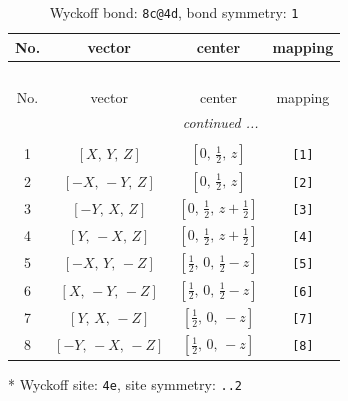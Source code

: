 \documentclass[fleqn,8pt]{jsarticle}
\begin{document}
\renewcommand{\arraystretch}{1.2}
\begin{longtable}{cccc}
\caption{Wyckoff bond: {\tt 8c@4d}, bond symmetry: {\tt 1}}
 \\
 \hline \hline
No. & vector & center & mapping \\ \hline \endfirsthead

\multicolumn{3}{l}{\tablename\ \thetable{}} \\
 \hline \hline
No. & vector & center & mapping \\ \hline \endhead

 \hline \hline
\multicolumn{3}{r}{\footnotesize\it continued ...} \\ \endfoot

 \hline \hline
\multicolumn{3}{r}{} \\ \endlastfoot

1 & $\left[ X,\, Y,\, Z \right]$ & $\left[ 0,\, \frac{1}{2},\, z \right]$ & {\tt [1]} \\ \hline
2 & $\left[ - X,\, - Y,\, Z \right]$ & $\left[ 0,\, \frac{1}{2},\, z \right]$ & {\tt [2]} \\ \hline
3 & $\left[ - Y,\, X,\, Z \right]$ & $\left[ 0,\, \frac{1}{2},\, z + \frac{1}{2} \right]$ & {\tt [3]} \\ \hline
4 & $\left[ Y,\, - X,\, Z \right]$ & $\left[ 0,\, \frac{1}{2},\, z + \frac{1}{2} \right]$ & {\tt [4]} \\ \hline
5 & $\left[ - X,\, Y,\, - Z \right]$ & $\left[ \frac{1}{2},\, 0,\, \frac{1}{2} - z \right]$ & {\tt [5]} \\ \hline
6 & $\left[ X,\, - Y,\, - Z \right]$ & $\left[ \frac{1}{2},\, 0,\, \frac{1}{2} - z \right]$ & {\tt [6]} \\ \hline
7 & $\left[ Y,\, X,\, - Z \right]$ & $\left[ \frac{1}{2},\, 0,\, - z \right]$ & {\tt [7]} \\ \hline
8 & $\left[ - Y,\, - X,\, - Z \right]$ & $\left[ \frac{1}{2},\, 0,\, - z \right]$ & {\tt [8]} \\
\end{longtable}
* Wyckoff site: {\tt 4e}, site symmetry: {\tt ..2}
\renewcommand{\arraystretch}{1.2}
\end{document}
